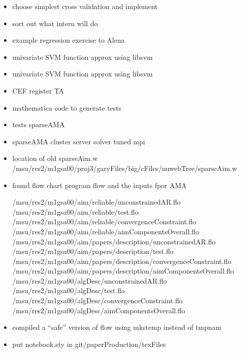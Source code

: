 \documentclass[hyperref]{labbook}
\begin{document}
  \begin{itemize}
  \item choose simplest cross validation and implement
  \item sort out what intern will do
  \item example regression exercise to Alena
  \end{itemize}

\begin{itemize}
\item univariate SVM function approx using libsvm
\end{itemize}


\begin{itemize}
\item univariate SVM function approx using libsvm
\item CEF register TA
\end{itemize}

\begin{itemize}
\item mathematica code to generate tests
\item tests sparseAMA
\item sparseAMA cluster server solver tuned mpi
\item location of old sparseAim.w /msu/res2/m1gsa00/proj3/garyFiles/big/cFiles/nuwebTree/sparseAim.w
\item  found flow chart program flow and the inputs fpor AMA

/msu/res2/m1gsa00/aim/reliable/unconstrainedAR.flo
/msu/res2/m1gsa00/aim/reliable/test.flo
/msu/res2/m1gsa00/aim/reliable/convergenceConstraint.flo
/msu/res2/m1gsa00/aim/reliable/aimComponentsOverall.flo
/msu/res2/m1gsa00/aim/papers/description/unconstrainedAR.flo
/msu/res2/m1gsa00/aim/papers/description/test.flo
/msu/res2/m1gsa00/aim/papers/description/convergenceConstraint.flo
/msu/res2/m1gsa00/aim/papers/description/aimComponentsOverall.flo
/msu/res2/m1gsa00/algDesc/unconstrainedAR.flo
/msu/res2/m1gsa00/algDesc/test.flo
/msu/res2/m1gsa00/algDesc/convergenceConstraint.flo
/msu/res2/m1gsa00/algDesc/aimComponentsOverall.flo
\item compiled a ``safe'' version of flow using mkstemp instead of tmpnam
\item put notebook.sty in  git/paperProduction/texFiles
\end{itemize}
\end{document}
